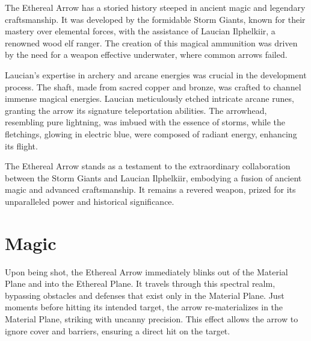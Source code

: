 The Ethereal Arrow has a storied history steeped in ancient magic and legendary craftsmanship. It was developed by the formidable Storm Giants, known for their mastery over elemental forces, with the assistance of Laucian Ilphelkiir, a renowned wood elf ranger. The creation of this magical ammunition was driven by the need for a weapon effective underwater, where common arrows failed.

Laucian's expertise in archery and arcane energies was crucial in the development process. The shaft, made from sacred copper and bronze, was crafted to channel immense magical energies. Laucian meticulously etched intricate arcane runes, granting the arrow its signature teleportation abilities. The arrowhead, resembling pure lightning, was imbued with the essence of storms, while the fletchings, glowing in electric blue, were composed of radiant energy, enhancing its flight.

The Ethereal Arrow stands as a testament to the extraordinary collaboration between the Storm Giants and Laucian Ilphelkiir, embodying a fusion of ancient magic and advanced craftsmanship. It remains a revered weapon, prized for its unparalleled power and historical significance.

\section*{Magic}

Upon being shot, the Ethereal Arrow immediately blinks out of the Material Plane and into the Ethereal Plane. It travels through this spectral realm, bypassing obstacles and defenses that exist only in the Material Plane. Just moments before hitting its intended target, the arrow re-materializes in the Material Plane, striking with uncanny precision. This effect allows the arrow to ignore cover and barriers, ensuring a direct hit on the target.